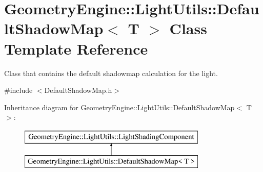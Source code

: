 \hypertarget{class_geometry_engine_1_1_light_utils_1_1_default_shadow_map}{}\section{Geometry\+Engine\+::Light\+Utils\+::Default\+Shadow\+Map$<$ T $>$ Class Template Reference}
\label{class_geometry_engine_1_1_light_utils_1_1_default_shadow_map}


Class that contains the default shadowmap calculation for the light.  




{\ttfamily \#include $<$Default\+Shadow\+Map.\+h$>$}

Inheritance diagram for Geometry\+Engine\+::Light\+Utils\+::Default\+Shadow\+Map$<$ T $>$\+:\begin{figure}[H]
\begin{center}
\leavevmode
\includegraphics[height=2.000000cm]{class_geometry_engine_1_1_light_utils_1_1_default_shadow_map}
\end{center}
\end{figure}
